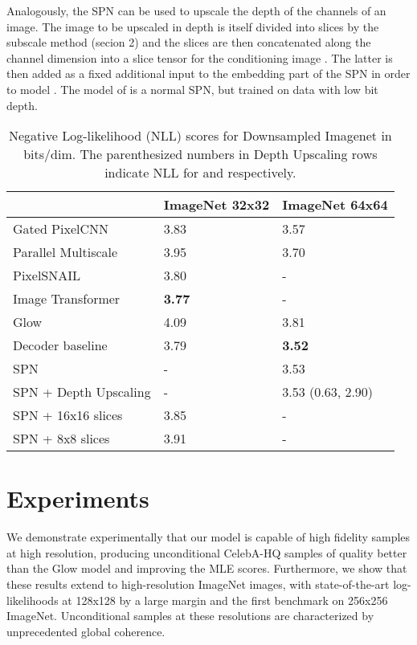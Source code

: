 \documentclass{article} \usepackage{iclr2019_conference,times}
\begin{document}
Analogously, the SPN can be used to upscale the depth of the channels of an image. The image to be upscaled in depth is itself divided into slices by the subscale method (secion 2) and the slices are then concatenated along the channel dimension into a slice tensor for the conditioning image . The latter is then added as a fixed additional input to the embedding part of the SPN in order to model . The model of  is a normal SPN, but trained on data with low bit depth.


\begin{table}[t]
\small
\begin{center}
\begin{tabular}{l|l|l}
& ImageNet 32x32 & ImageNet 64x64 \\
\hline
\hline
Gated PixelCNN \citep{gatedpix} & 3.83 & 3.57 \\
Parallel Multiscale \citep{ParallelMultiscale} & 3.95 & 3.70 \\
PixelSNAIL \citep{pixelsnail} & 3.80 & - \\
Image Transformer \citep{Parmar18} & \bf{3.77} & - \\
Glow \citep{Glow} & 4.09 & 3.81 \\
\hline
\hline
Decoder baseline & 3.79 & \bf{3.52} \\
SPN & - & 3.53 \\
SPN + Depth Upscaling & - & 3.53 (0.63, 2.90) \\
SPN + 16x16 slices & 3.85 & - \\
SPN + 8x8 slices & 3.91 & - \\
\end{tabular}
\caption{Negative Log-likelihood (NLL) scores for Downsampled Imagenet \citep{PixelRNN} in bits/dim. The parenthesized numbers in Depth Upscaling rows indicate NLL for  and  respectively.}
\end{center}
\label{tab:dsimagenet}
\end{table}




\section{Experiments}

We demonstrate experimentally that our model is capable of high fidelity samples at high resolution, producing unconditional CelebA-HQ samples of quality better than the Glow model \citep{Glow} and  improving the MLE scores. Furthermore, we show that these results extend to high-resolution ImageNet images, with state-of-the-art log-likelihoods at 128x128 by a large margin and the first benchmark on 256x256 ImageNet. Unconditional samples at these resolutions are characterized by unprecedented global coherence.
\end{document}
